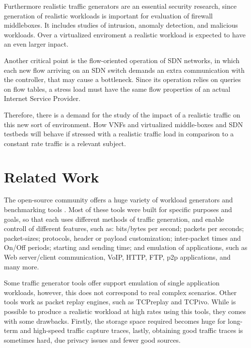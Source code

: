Furthermore realistic traffic generators are an essential security research\cite{ditg-paper}, since generation of realistic workloads is important for evaluation of firewall middleboxes. It includes studies of intrusion, anomaly detection, and malicious workloads\cite{ditg-paper}. Over a virtualized enviroment a realistic workload is expected to have an even larger inpact.


Another critical point is the flow-oriented operation of SDN networks, in which each new flow arriving on an SDN switch demands an extra communication with the controller, that may cause a bottleneck. Since its operation relies on queries on flow tables, a stress load must have the same flow properties of an actual Internet Service Provider. 

Therefore, there is a demand for the study of the impact of a realistic traffic on this new sort of environment. How VNFs and virtualized middle-boxes and SDN testbeds will behave if stressed with a realistic traffic load in comparison to a constant rate traffic is a relevant subject.



\section{Related Work}


The open-source community offers a huge variety of workload generators and benchmarking tools \cite{ditg-paper}\cite{validate-trafficgen}\cite{comparative-trafficgen-tools}\cite{performance-trafficgen}. Most of these tools were built for specific purposes and goals, so that each uses different methods of traffic generation, and enable controll of different features, such as: bits/bytes per second; packets per seconds; packet-sizes; protocols, header or payload customization; inter-packet times and On/Off periods; starting and sending time; and emulation of applications, such as Web server/client communication, VoIP, HTTP, FTP, p2p applications, and many more.


Some traffic generator tools offer support emulation of single application workloads, however, this does not correspond to real complex scenarios. Other tools work as packet replay engines, such as TCPreplay and TCPivo. While is possible to produce a realistic workload at high rates using this tools, they comes with some drawbacks. Firstly, the storage space required becomes huge for long-term and high-speed traffic capture traces, lastly, obtaining good traffic traces is sometimes hard, due privacy issues and fewer good sources. 


